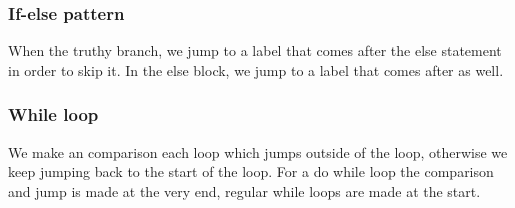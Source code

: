 \subsubsection{If-else pattern}\label{ssub:if_else_pattern}

When the truthy branch, we jump to a label that comes after the else statement in order to skip it.
In the else block, we jump to a label that comes after as well.

\subsubsection{While loop}\label{ssub:while_loop}

We make an comparison each loop which jumps outside of the loop, otherwise we keep jumping back to the start of the loop.
For a do while loop the comparison and jump is made at the very end, regular while loops are made at the start.


